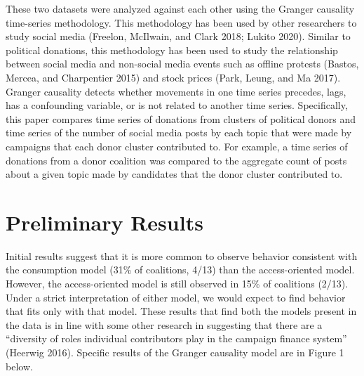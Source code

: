 \documentclass[12pt,]{article}
\begin{document}
These two datasets were analyzed against each other using the Granger
causality time-series methodology. This methodology has been used by
other researchers to study social media (Freelon, McIlwain, and Clark
2018; Lukito 2020). Similar to political donations, this methodology has
been used to study the relationship between social media and non-social
media events such as offline protests (Bastos, Mercea, and Charpentier
2015) and stock prices (Park, Leung, and Ma 2017). Granger causality
detects whether movements in one time series precedes, lags, has a
confounding variable, or is not related to another time series.
Specifically, this paper compares time series of donations from clusters
of political donors and time series of the number of social media posts
by each topic that were made by campaigns that each donor cluster
contributed to. For example, a time series of donations from a donor
coalition was compared to the aggregate count of posts about a given
topic made by candidates that the donor cluster contributed to.

\hypertarget{preliminary-results}{%
\section{Preliminary Results}\label{preliminary-results}}

Initial results suggest that it is more common to observe behavior
consistent with the consumption model (31\% of coalitions, 4/13) than
the access-oriented model. However, the access-oriented model is still
observed in 15\% of coalitions (2/13). Under a strict interpretation of
either model, we would expect to find behavior that fits only with that
model. These results that find both the models present in the data is in
line with some other research in suggesting that there are a ``diversity
of roles individual contributors play in the campaign finance system''
(Heerwig 2016). Specific results of the Granger causality model are in
Figure 1 below.
\end{document}
